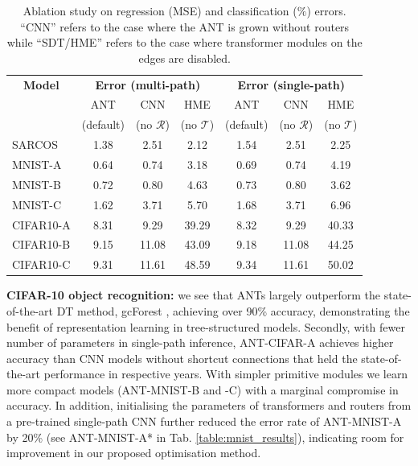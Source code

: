 \begin{table}[t]
	\caption{\footnotesize Ablation study on regression (MSE) and classification ($\%$) errors. ``CNN'' refers to the case where the ANT is grown without routers while ``SDT/HME'' refers to the case where transformer modules on the edges are disabled.} \label{tab:ablationstudy}
	\scriptsize
    \center
	\begin{tabular}{|l|ccc|ccc|}
		\hline
		\multicolumn{1}{|c}{\textbf{Model}} &  \multicolumn{3}{|c|}{\textbf{Error (multi-path)}} & \multicolumn{3}{c|}{\textbf{Error (single-path)}}  \\
			& ANT & CNN & HME & ANT & CNN & HME  \\
			& (default) & (no $\mathcal{R}$) & (no $\mathcal{T}$) & (default) & (no $\mathcal{R}$) & (no $\mathcal{T}$) \\
		\hline
		SARCOS &1.38 & 2.51 & 2.12 &1.54 & 2.51 & 2.25 \\
		MNIST-A &0.64 & 0.74 & 3.18 &0.69 & 0.74 & 4.19  \\
	    MNIST-B &0.72 & 0.80 & 4.63 &0.73 & 0.80 & 3.62\\
        MNIST-C &1.62 & 3.71 & 5.70 &1.68 & 3.71 & 6.96 \\
		CIFAR10-A &8.31 & 9.29 & 39.29   & 8.32 & 9.29 & 40.33 \\
        CIFAR10-B &9.15 & 11.08 & 43.09 & 9.18 & 11.08 & 44.25 \\
        CIFAR10-C &9.31 & 11.61 & 48.59 & 9.34 & 11.61 & 50.02 \\
		\hline
	\end{tabular}
\end{table}

\textbf{CIFAR-10 object recognition:} we see that ANTs largely outperform the state-of-the-art DT method, gcForest \cite{zhou2017deepft}, achieving over 90\% accuracy, demonstrating the benefit of representation learning in tree-structured models. Secondly, with fewer number of parameters in single-path inference, ANT-CIFAR-A achieves higher accuracy than CNN models without shortcut connections \cite{goodfellow2013maxout,lin2013network,springenberg2014striving} that held the state-of-the-art performance in respective years. With simpler primitive modules we learn more compact models (ANT-MNIST-B and -C) with a marginal compromise in accuracy. In addition, initialising the parameters of transformers and routers from a pre-trained single-path CNN further reduced the error rate of ANT-MNIST-A by 20\% (see ANT-MNIST-A* in Tab. \ref{table:mnist_results}), indicating room for improvement in our proposed optimisation method.

